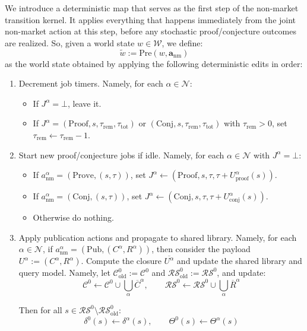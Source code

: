  We introduce a deterministic map that serves as the first step of the non-market transition kernel. It applies everything that happens immediately from the joint non-market action at this step, before any stochastic proof/conjecture outcomes are realized. So, given a world state $w \in \mathcal{W}$, we define:
\[\tilde w := \mathrm{Pre}(w,\mathbf a_{\mathrm{nm}})\]
as the world state obtained by applying the following deterministic edits in order:
\begin{enumerate}
    \item Decrement job timers. Namely, for each $\alpha \in \mathcal{N}$:
    \begin{itemize}
        \item If $J^\alpha=\bot$, leave it.
	\item If $J^\alpha=(\mathrm{Proof},s,\tau_{\mathrm{rem}},\tau_{\mathrm{tot}})$ or $(\mathrm{Conj},s,\tau_{\mathrm{rem}},\tau_{\mathrm{tot}})$ with $\tau_{\mathrm{rem}}>0$, set
$\tau_{\mathrm{rem}}\leftarrow \tau_{\mathrm{rem}}-1$.
    \end{itemize}
\item Start new proof/conjecture jobs if idle. Namely, for each $\alpha \in \mathcal N$ with $J^\alpha=\bot$:
\begin{itemize}
    \item 	If $a^\alpha_{\mathrm{nm}}=(\mathrm{Prove},(s,\tau))$, set
$J^\alpha \leftarrow (\mathrm{Proof},s,\tau,\tau+U^\alpha_{\mathrm{proof}}(s))$.
	\item	If $a^\alpha_{\mathrm{nm}}=(\mathrm{Conj},(s,\tau))$, set
$J^\alpha \leftarrow (\mathrm{Conj},s,\tau,\tau+U^\alpha_{\mathrm{conj}}(s))$.
	\item	Otherwise do nothing.
\end{itemize}
\item Apply publication actions and propagate to shared library. Namely, for each $\alpha\in\mathcal{N}$, if $a^\alpha_{\mathrm{nm}}=(\mathrm{Pub},(C^\alpha,R^\alpha))$, then consider the payload $U^\alpha:=(C^\alpha,R^\alpha)$. Compute the closure $\overline{U^\alpha}$ and update the shared library and query model. Namely, let $\mathcal{C}^0_\mathrm{old} := \mathcal{C}^0$ and $\mathcal{RS}^0_\mathrm{old} := \mathcal{RS}^0$, and update:
\[\mathcal C^0 \leftarrow \mathcal C^0 \cup \bigcup_{\alpha}\overline C^\alpha,
\qquad
\mathcal{RS}^0 \leftarrow \mathcal{RS}^0 \cup \bigcup_{\alpha}\overline R^\alpha\]

Then for all $s \in \mathcal{RS}^0 \setminus \mathcal{RS}^0_\mathrm{old}$:
\[\delta^0(s) \leftarrow \delta^\alpha(s),\qquad  \Theta^0(s) \leftarrow \Theta^\alpha(s)\]


\end{enumerate}
